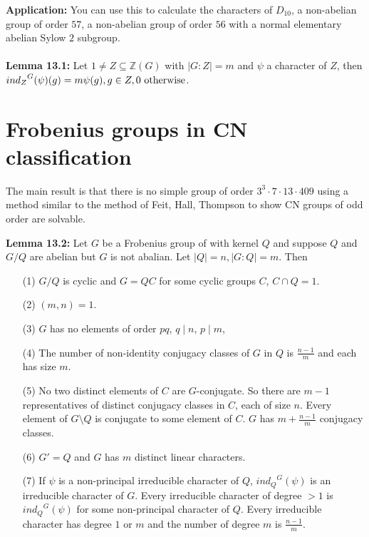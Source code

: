 {\bf Application:} You can use this to calculate the characters of $D_{10}$, a non-abelian group of order $57$, a non-abelian
group of order $56$ with a normal elementary abelian Sylow $2$ subgroup.
\\
\\
{\bf Lemma 13.1:} Let $1 \ne Z \subseteq {\mathbb Z}(G)$ with $|G:Z|=m$ and $\psi$ a character of $Z$, then
${ind_Z}^G(\psi)(g) = m \psi(g), g \in Z, 0 \textnormal{ otherwise}$.
\section {Frobenius groups in CN classification}
The main result is that there is no simple group of order $3^3 \cdot 7 \cdot 13 \cdot 409$ using a method similar to 
the method of Feit, Hall, Thompson to show CN groups of odd order are solvable.
\begin{quote}
\end{quote}
{\bf Lemma 13.2:} Let $G$ be a Frobenius group of with kernel $Q$ and suppose $Q$ and $G/Q$ are abelian but $G$ is not abalian.
Let $|Q|=n, |G:Q|=m$.  Then
\begin{itemize}
\item[(1)] $G/Q$ is cyclic and $G= QC$ for some cyclic groups $C$, $C \cap Q = 1$.
\item[(2)] $(m, n) =1$.
\item[(3)] $G$ has no elements of order $pq$, $q \mid n$, $p \mid m$,
\item[(4)] The number of non-identity conjugacy classes of $G$ in $Q$ is ${\frac {n-1} m}$ and each has size $m$.
\item[(5)] No two distinct elements of $C$ are $G$-conjugate.  So there are $m-1$ representatives of distinct conjugacy classes in $C$,
each of size $n$.  Every element of $G \setminus Q$ is conjugate to some element of $C$.  $G$ has $m + {\frac {n-1} m}$ conjugacy classes.
\item[(6)] $G' = Q$ and $G$ has $m$ distinct linear characters.
\item[(7)] If $\psi$ is a non-principal irreducible character of $Q$, ${ind_Q}^G(\psi)$ is an irreducible character of $G$.
Every irreducible character of degree $>1$ is ${ind_Q}^G(\psi)$ for some non-principal character of $Q$.  Every irreducible character has
degree $1$ or $m$ and the number of degree $m$ is ${\frac {n-1} m}$.
\end{itemize}
